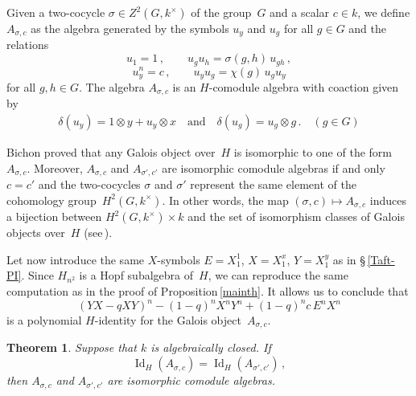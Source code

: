 \documentclass[11pt, a4paper]{amsart}
\newtheorem{theorem}{Theorem}[section]
\theoremstyle{definition}
\numberwithin{equation}{section}
\begin{document}
Given a two-cocycle $\sigma \in Z^2(G,k^{\times})$ of the group~$G$ and a scalar $c\in k$,
we define $A_{\sigma, c}$ as the algebra generated by the symbols $u_y$ and $u_g$ for all $g\in G$
and the relations
\begin{equation}\label{rel-kG}
u_1 = 1 \, , \qquad 
u_g u_h = \sigma(g,h) \, u_{gh} \, , 
\end{equation}
\begin{equation}
u_y^n = c \, , \qquad 
u_y u_g  = \chi(g) \, u_g u_y 
\end{equation}
for all $g,h \in G$.
The algebra $A_{\sigma, c}$ is an $H$-comodule algebra with coaction given by
\begin{eqnarray}
\delta(u_y) = 1 \otimes y + u_y \otimes x 
\quad\text{and}\quad
\delta(u_g) = u_g \otimes g \, . \quad(g\in G)
\end{eqnarray}

Bichon proved that any Galois object over~$H$ is isomorphic to one of the form~$A_{\sigma, c}$. Moreover,
$A_{\sigma, c}$ and $A_{\sigma', c'}$ are isomorphic comodule algebras if and only
$c= c'$ and the two-cocycles $\sigma$ and $\sigma'$ represent the same element of the cohomology group~$H^2(G,k^{\times})$.
In other words, the map $(\sigma,c) \mapsto A_{\sigma, c}$ induces a bijection between 
$H^2(G,k^{\times}) \times k $ and the set of isomorphism classes of Galois objects over~$H$
(see\,\cite[Th.\,2.1]{Bi}).

Let now introduce the same $X$-symbols $E = X_1^1$, $X= X_1^x$, $Y= X_1^y$
as in \S\,\ref{Taft-PI}. Since $H_{n^2}$ is a Hopf subalgebra of~$H$,
we can reproduce the same computation as in the proof of Proposition\,\ref{mainth}.
It allows us to conclude that
\begin{equation}\label{PI-monomial}
(YX - qXY)^n - (1-q)^n X^nY^n +  (1-q)^n c \,  E^nX^n 
\end{equation}
is a polynomial $H$-identity for the Galois object~$A_{\sigma,c}$.

\begin{theorem}\label{mainth2}
Suppose that $k$ is algebraically closed.
If 
\[\operatorname{Id}_{H}(A_{\sigma,c}) = \operatorname{Id}_{H}(A_{\sigma',c'})\, ,
\] 
then $A_{\sigma,c}$ and $A_{\sigma',c'}$ are isomorphic comodule algebras.
\end{theorem}
\end{document}
